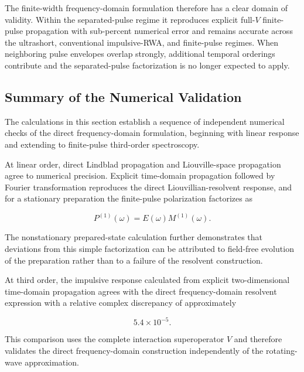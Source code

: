\documentclass[11pt]{article}
\begin{document}
The finite-width frequency-domain formulation therefore has a clear
domain of validity.  Within the separated-pulse regime it reproduces
explicit full-$V$ finite-pulse propagation with sub-percent numerical
error and remains accurate across the ultrashort, conventional
impulsive-RWA, and finite-pulse regimes.  When neighboring pulse
envelopes overlap strongly, additional temporal orderings contribute
and the separated-pulse factorization is no longer expected to apply.

\subsection{Summary of the Numerical Validation}
\label{subsec:numerical_validation_summary}

The calculations in this section establish a sequence of independent
numerical checks of the direct frequency-domain formulation, beginning
with linear response and extending to finite-pulse third-order
spectroscopy.

At linear order, direct Lindblad propagation and Liouville-space
propagation agree to numerical precision.  Explicit time-domain
propagation followed by Fourier transformation reproduces the direct
Liouvillian-resolvent response, and for a stationary preparation the
finite-pulse polarization factorizes as

\begin{equation}
P^{(1)}(\omega)
=
E(\omega)
M^{(1)}(\omega).
\end{equation}

The nonstationary prepared-state calculation further demonstrates that
deviations from this simple factorization can be attributed to
field-free evolution of the preparation rather than to a failure of
the resolvent construction.

At third order, the impulsive response calculated from explicit
two-dimensional time-domain propagation agrees with the direct
frequency-domain resolvent expression with a relative complex
discrepancy of approximately

\begin{equation}
5.4\times10^{-5}.
\end{equation}

This comparison uses the complete interaction superoperator $V$ and
therefore validates the direct frequency-domain construction
independently of the rotating-wave approximation.
\end{document}
